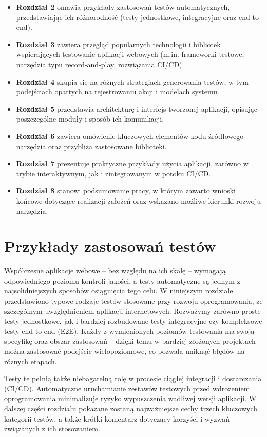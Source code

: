 \documentclass[12pt]{report}
\begin{document}
\begin{itemize}
    \item \textbf{Rozdział 2} omawia przykłady zastosowań testów automatycznych, przedstawiając ich różnorodność (testy jednostkowe, integracyjne oraz end-to-end).
    \item \textbf{Rozdział 3} zawiera przegląd popularnych technologii i bibliotek wspierających testowanie aplikacji webowych (m.in. frameworki testowe, narzędzia typu record-and-play, rozwiązania CI/CD).
    \item \textbf{Rozdział 4} skupia się na różnych strategiach generowania testów, w tym podejściach opartych na rejestrowaniu akcji i modelach systemu.
    \item \textbf{Rozdział 5} przedstawia architekturę i interfejs tworzonej aplikacji, opisując poszczególne moduły i sposób ich komunikacji.
    \item \textbf{Rozdział 6} zawiera omówienie kluczowych elementów kodu źródłowego narzędzia oraz przybliża zastosowane biblioteki.
    \item \textbf{Rozdział 7} prezentuje praktyczne przykłady użycia aplikacji, zarówno w trybie interaktywnym, jak i zintegrowanym w potoku CI/CD.
    \item \textbf{Rozdział 8} stanowi podsumowanie pracy, w którym zawarto wnioski końcowe dotyczące realizacji założeń oraz wskazano możliwe kierunki rozwoju narzędzia.
\end{itemize}

\chapter{Przykłady zastosowań testów}
\label{chap:przyklady-testow}
Współczesne aplikacje webowe – bez względu na ich skalę – wymagają odpowiedniego poziomu kontroli jakości, a testy automatyczne są jednym z najsolidniejszych sposobów osiągnięcia tego celu. W niniejszym rozdziale przedstawiono typowe rodzaje testów stosowane przy rozwoju oprogramowania, ze szczególnym uwzględnieniem aplikacji internetowych. Rozważymy zarówno proste testy jednostkowe, jak i bardziej rozbudowane testy integracyjne czy kompleksowe testy end-to-end (E2E). Każdy z wymienionych poziomów testowania ma swoją specyfikę oraz obszar zastosowań – dzięki temu w bardziej złożonych projektach można zastosować podejście wielopoziomowe, co pozwala uniknąć błędów na różnych etapach.

Testy te pełnią także niebagatelną rolę w procesie ciągłej integracji i dostarczania (CI/CD). Automatyczne uruchamianie zestawów testowych przed wdrożeniem oprogramowania minimalizuje ryzyko wypuszczenia wadliwej wersji aplikacji. W dalszej części rozdziału pokazane zostaną najważniejsze cechy trzech kluczowych kategorii testów, a także krótki komentarz dotyczący korzyści i wyzwań związanych z ich stosowaniem.
\end{document}
